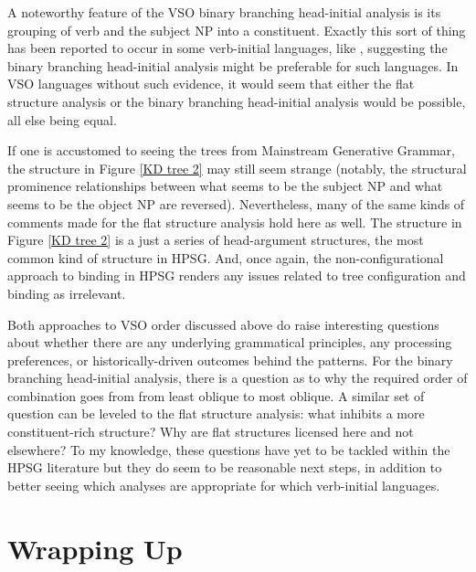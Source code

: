 \documentclass[output=paper]{langsci/langscibook}
\begin{document}
{ A noteworthy feature of the VSO binary branching head-initial analysis is its grouping of verb and the subject NP into a constituent. Exactly this sort of thing has been reported to occur in some verb-initial languages, like  \citep{keenan2000}, suggesting the binary branching head-initial analysis might be preferable for such languages. In VSO languages without such evidence, it would seem that either the flat structure analysis or the binary branching head-initial analysis would be possible, all else being equal.  
 
If one is accustomed to seeing the trees from Mainstream Generative Grammar, the structure in Figure \ref{KD tree 2} may still seem strange (notably, the structural prominence relationships between what seems to be the subject NP and what seems to be the object NP are reversed). Nevertheless, many of the same kinds of comments made for the flat structure analysis hold here as well. The structure in Figure \ref{KD tree 2} is a just a series of head-argument structures, the most common kind of structure in HPSG. And, once again, the non-configurational approach to binding in HPSG renders any issues related to tree configuration and binding as irrelevant.    

Both approaches to VSO order discussed above do raise interesting questions about whether there are any underlying grammatical principles, any processing preferences, or historically-driven outcomes behind the patterns. For the binary branching head-initial analysis, there is a question as to why the required order of combination goes from from least oblique to most oblique. A similar set of question can be leveled to the flat structure analysis: what inhibits a more constituent-rich structure? Why are flat structures licensed here and not elsewhere? To my knowledge, these questions have yet to be tackled within the HPSG literature but they do seem to be reasonable next steps, in addition to better seeing which analyses are appropriate for which verb-initial languages. 
	
\section{Wrapping Up}

}
\end{document}
